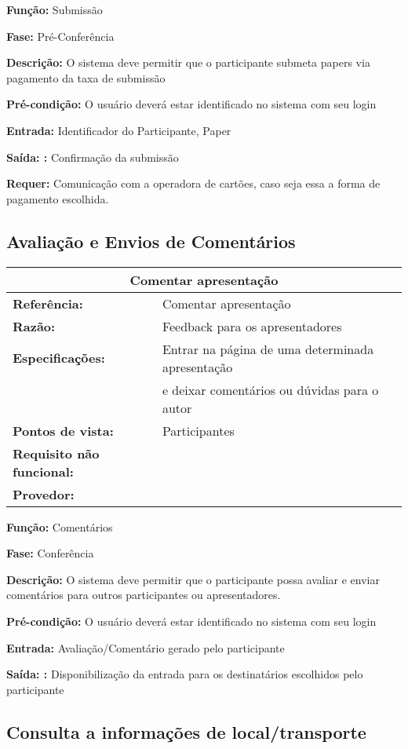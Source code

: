 \documentclass[letter]{article}
\begin{document}
\textbf{Função:} Submissão

\textbf{Fase: } Pré-Conferência

\textbf{Descrição: } O sistema deve permitir que o participante submeta papers via pagamento da taxa de submissão

\textbf{Pré-condição: } O usuário deverá estar identificado no sistema com seu login

\textbf{Entrada: } Identificador do Participante, Paper

\textbf{Saída: :} Confirmação da submissão

\textbf{Requer:} Comunicação com a operadora de cartões, caso seja essa a forma de pagamento escolhida.

\subsection{ Avaliação e Envios de Comentários}

%
\begin{table}[h!]
\begin{center}
\begin{tabular}{|ll|}
\hline 
\multicolumn{2}{|c|}{\textbf{Comentar apresentação}}\tabularnewline
\hline
\textbf{Referência:} & Comentar apresentação\tabularnewline
\textbf{Razão:} & Feedback para os apresentadores\tabularnewline
\textbf{Especificações:} & Entrar na página de uma determinada apresentação\tabularnewline
& e deixar comentários
ou dúvidas para o autor\tabularnewline
\textbf{Pontos de vista:} & Participantes\tabularnewline
\textbf{Requisito não funcional:} & \tabularnewline
\textbf{Provedor:} & \tabularnewline
\hline
\end{tabular}
\end{center}
\end{table}


\textbf{Função:} Comentários

\textbf{Fase: } Conferência

\textbf{Descrição: } O sistema deve permitir que o participante possa avaliar e enviar comentários para outros participantes ou apresentadores.

\textbf{Pré-condição: } O usuário deverá estar identificado no sistema com seu login

\textbf{Entrada: } Avaliação/Comentário gerado pelo participante

\textbf{Saída: :} Disponibilização da entrada para os destinatários escolhidos pelo participante


\subsection{ Consulta a informações de local/transporte}
\end{document}
